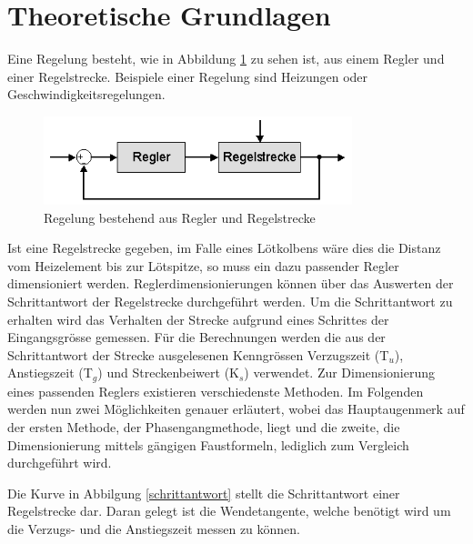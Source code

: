 \section{Theoretische Grundlagen}
Eine Regelung besteht, wie in Abbildung \ref{regelstrecke} zu sehen ist, aus einem Regler und einer Regelstrecke. Beispiele einer Regelung sind Heizungen oder Geschwindigkeitsregelungen.\newline 

\begin{figure}[h]
\centering
\includegraphics[width=0.8\textwidth]{Regelstrecke.png}
\caption{Regelung bestehend aus Regler und Regelstrecke}
\label{regelstrecke}
\end{figure}


Ist eine Regelstrecke gegeben, im Falle eines Lötkolbens wäre dies die Distanz vom Heizelement bis zur Lötspitze, so muss ein dazu passender Regler dimensioniert werden. Reglerdimensionierungen können über das Auswerten der Schrittantwort der Regelstrecke durchgeführt werden. Um die Schrittantwort zu erhalten wird das Verhalten der Strecke aufgrund eines Schrittes der Eingangsgrösse gemessen. Für die Berechnungen werden die aus der Schrittantwort der Strecke ausgelesenen Kenngrössen Verzugszeit (T$_u$), Anstiegszeit (T$_g$) und Streckenbeiwert (K$_s$) verwendet. Zur Dimensionierung eines passenden Reglers existieren verschiedenste Methoden. Im Folgenden werden nun zwei Möglichkeiten genauer erläutert, wobei das Hauptaugenmerk auf der ersten Methode, der Phasengangmethode, liegt und die zweite, die Dimensionierung mittels gängigen Faustformeln, lediglich zum Vergleich durchgeführt wird.\newline

\newpage
Die Kurve in Abbilgung \ref{schrittantwort} stellt die Schrittantwort einer Regelstrecke dar. Daran gelegt ist die Wendetangente, welche benötigt wird um die Verzugs- und die Anstiegszeit messen zu können.\newline

